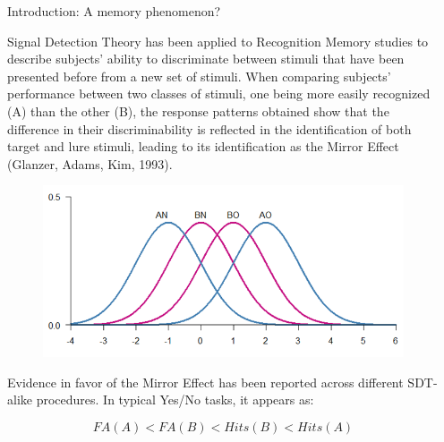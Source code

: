 \documentclass[final]{beamer}
\newlength{\sepwid}
\newlength{\onecolwid}
\begin{document}
\begin{frame}[t]

\begin{columns}[t] %
\begin{column}{\sepwid}\end{column} %
\begin{column}{\onecolwid} %


\begin{alertblock}{Introduction: A memory phenomenon?}

Signal Detection Theory has been applied to Recognition Memory studies to describe subjects’ ability to discriminate between stimuli that have been presented before from a new set of stimuli. When comparing subjects' performance between two classes of stimuli, one being more easily recognized (A) than the other (B), the response patterns obtained show that the difference in their discriminability is reflected in the identification of both target and lure stimuli, leading to its identification as the Mirror Effect (Glanzer, Adams, Kim, 1993).


\begin{figure}
\includegraphics[width=0.5\linewidth]{Figures/MirrorEffect.png}
\end{figure}

Evidence in favor of the Mirror Effect has been reported across different SDT-alike procedures. In typical Yes/No tasks, it appears as:

\begin{equation}
FA(A) < FA(B) < Hits(B) < Hits(A)
\label{eqn:Rates}
\end{equation}


\end{alertblock}
\end{column}
\end{columns}
\end{frame}
\end{document}
